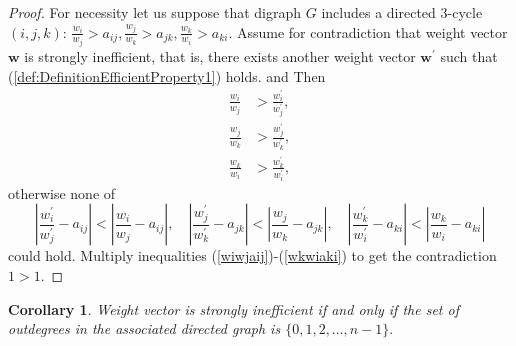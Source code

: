 \documentclass{article}
\theoremstyle{plain}
\newtheorem{corollary}{Corollary}
\begin{document}
\begin{proof}
For necessity let us suppose that digraph $G$ includes a directed 3-cycle $(i,j,k)$:
$
\frac{w_i}{w_j} > a_{ij},
\frac{w_j}{w_k} > a_{jk},
\frac{w_k}{w_i} > a_{ki}.
$
Assume for contradiction that weight vector $\mathbf{w}$ is strongly inef{\kern0pt}f{\kern0pt}icient,
that is, there exists another weight vector $\mathbf{w}^{\prime}$ such that
(\ref{def:DefinitionEfficientProperty1}) holds.
and
Then
\begin{align}
\frac{w_i}{w_j}  &>  \frac{w_i^{\prime}}{w_j^{\prime}},  \label{wiwjaij}  \\  %
\frac{w_j}{w_k}  &>  \frac{w_j^{\prime}}{w_k^{\prime}},  \label{wjwkajk}  \\  %
\frac{w_k}{w_i}  &>  \frac{w_k^{\prime}}{w_i^{\prime}},  \label{wkwiaki}    %
\end{align}
otherwise none of
\[
\left| \frac{w_i^{\prime}}{w_j^{\prime}} - a_{ij}  \right|  <  \left| \frac{w_i}{w_j} - a_{ij}  \right|,  \quad
\left| \frac{w_j^{\prime}}{w_k^{\prime}} - a_{jk}  \right|  <  \left| \frac{w_j}{w_k} - a_{jk}  \right|,  \quad
\left| \frac{w_k^{\prime}}{w_i^{\prime}} - a_{ki}  \right|  <  \left| \frac{w_k}{w_i} - a_{ki}  \right|
\]
could hold. Multiply inequalities (\ref{wiwjaij})-(\ref{wkwiaki})
to get the contradiction $1>1.$
\end{proof}

\begin{corollary} \label{corollary:outdegrees}
Weight vector is strongly inef{\kern0pt}f{\kern0pt}icient if and only if the set of outdegrees
in the associated directed graph is $\{0,1,2,\ldots,n-1\}.$
\end{corollary}
\end{document}
